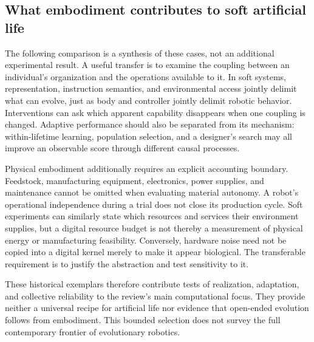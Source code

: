 \subsection{What embodiment contributes to soft artificial life}

The following comparison is a synthesis of these cases, not an additional
experimental result. A useful transfer is to examine the coupling between an
individual's organization and the operations available to it. In soft systems,
representation, instruction semantics, and environmental access jointly delimit
what can evolve, just as body and controller jointly delimit robotic behavior.
Interventions can ask which apparent capability disappears when one coupling is
changed. Adaptive performance should also be separated from its mechanism:
within-lifetime learning, population selection, and a designer's search may all
improve an observable score through different causal processes.

Physical embodiment additionally requires an explicit accounting boundary.
Feedstock, manufacturing equipment, electronics, power supplies, and maintenance
cannot be omitted when evaluating material autonomy. A robot's operational
independence during a trial does not close its production cycle. Soft experiments
can similarly state which resources and services their environment supplies, but
a digital resource budget is not thereby a measurement of physical energy or
manufacturing feasibility. Conversely, hardware noise need not be copied into a
digital kernel merely to make it appear biological. The transferable requirement
is to justify the abstraction and test sensitivity to it.

These historical exemplars therefore contribute tests of realization,
adaptation, and collective reliability to the review's main computational focus.
They provide neither a universal recipe for artificial life nor evidence that
open-ended evolution follows from embodiment. This bounded selection does not
survey the full contemporary frontier of evolutionary robotics.
